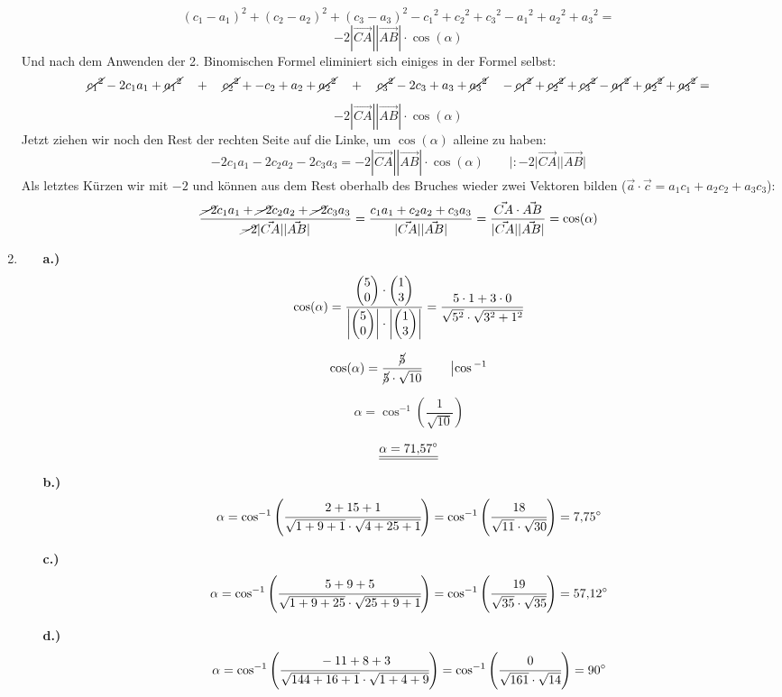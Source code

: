 \begin{enumerate}
		$$(c_1-a_1)^2+(c_2-a_2)^2+(c_3-a_3)^2-{c_1}^2+{c_2}^2+{c_3}^2-{a_1}^2+{a_2}^2+{a_3}^2=$$
		$$-2|\vec{CA}||\vec{AB}|\cdot \cos(\alpha) $$
Und nach dem Anwenden der 2. Binomischen Formel eliminiert sich einiges in der Formel selbst:		
		$$\cancel{{c_1}^2}-2c_1a_1+\cancel{{a_1}^2}\quad+\quad\cancel{{c_2}^2}+-c_2+a_2+\cancel{{a_2}^2}\quad+\quad\cancel{{c_3}^2}-2c_3+a_3+\cancel{{a_3}^2}\quad-\cancel{{c_1}^2}+\cancel{{c_2}^2}+\cancel{{c_3}^2}-\cancel{{a_1}^2}+\cancel{{a_2}^2}+\cancel{{a_3}^2}=$$
		$$-2|\vec{CA}||\vec{AB}|\cdot \cos(\alpha) $$
Jetzt ziehen wir noch den Rest der rechten Seite auf die Linke, um $\cos(\alpha)$ alleine zu haben:
		$$-2c_1a_1-2c_2a_2-2c_3a_3=-2|\vec{CA}||\vec{AB}|\cdot \cos(\alpha) \qquad | :-2|\vec{CA}||\vec{AB}|$$
Als letztes Kürzen wir mit $-2$ und können aus dem Rest oberhalb des Bruches wieder zwei Vektoren bilden ($\vec{a}\cdot\vec{c}=a_1c_1+a_2c_2+a_3c_3$):	
		$$\dfrac{\cancel{-2}c_1a_1+\cancel{-2}c_2a_2+\cancel{-2}c_3a_3}{\cancel{-2}|\vec{CA}||\vec{AB}|}=\dfrac{c_1a_1+c_2a_2+c_3a_3}{|\vec{CA}||\vec{AB}|}=\dfrac{\vec{CA}\cdot\vec{AB}}{|\vec{CA}||\vec{AB}|}=\cos(\alpha)$$
	

	
		\item
			\begin{enumerate}
				\item[\textbf{a.)}]	$$ \cos(\alpha)=\dfrac{\begin{pmatrix} 5 \\ 0 \end{pmatrix} \cdot \begin{pmatrix} 1 \\ 3 \end{pmatrix}} {\left|\begin{pmatrix} 5 \\ 0 \end{pmatrix}\right| \cdot \left| \begin{pmatrix} 1 \\ 3 \end{pmatrix}\right|}=\dfrac{5\cdot1+3\cdot0} {\sqrt{5^2} \cdot \sqrt{3^2+1^2}} $$
								
				$$ \cos(\alpha)=\dfrac{\cancel{5}}{\cancel{5}\cdot\sqrt{10}} \qquad \left|\cos{}^{-1}\right.$$ 
								
				$$\alpha=\cos^{-1}\left(\dfrac{1}{\sqrt{10}}\right)$$
				
				$$\underline{\underline{\alpha = 71\mathrm{,}57^\circ}}$$
\medskip
				\item[\textbf{b.)}]			
				$$\alpha=\cos^{-1}\left(\cfrac{2+15+1}{\sqrt{1+9+1}\cdot\sqrt{4+25+1}}\right)=\cos^{-1}\left(\cfrac{18}{\sqrt{11}\cdot\sqrt{30}}\right)=7\mathrm{,}75^\circ$$
				\item[\textbf{c.)}]	$$\alpha=\cos^{-1}\left(\cfrac{5+9+5}{\sqrt{1+9+25}\cdot\sqrt{25+9+1}}\right)=\cos^{-1}\left(\cfrac{19}{\sqrt{35}\cdot\sqrt{35}}\right)=57\mathrm{,}12^\circ$$
				\item[\textbf{d.)}]	$$\alpha=\cos^{-1}\left(\cfrac{-11+8+3}{\sqrt{144+16+1}\cdot\sqrt{1+4+9}}\right)=\cos^{-1}\left(\cfrac{0}{\sqrt{161}\cdot\sqrt{14}}\right)=90^\circ$$	
		\end{enumerate}
		\hfill\newline
		\end{enumerate}
